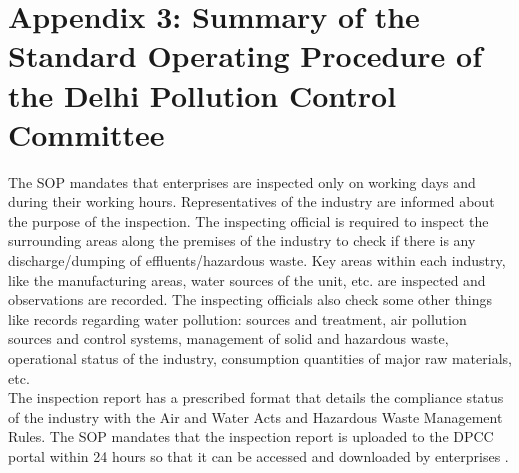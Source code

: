 \documentclass[a4paper, 12pt]{article}
\begin{document}
		\newpage
		
		\section*{Appendix 3: Summary of the Standard Operating Procedure of the Delhi Pollution Control Committee}
				
		The SOP mandates that enterprises are inspected only on working days and during their working hours. Representatives of the industry are informed about the purpose of the inspection. The inspecting official is required to inspect the surrounding areas along the premises of the industry to check if there is any discharge/dumping of effluents/hazardous waste. Key areas within each industry, like the manufacturing areas, water sources of the unit, etc. are inspected and observations are recorded. The inspecting officials also check some other things like records regarding water pollution: sources and treatment, air pollution sources and control systems, management of solid and hazardous waste, operational status of the industry, consumption quantities of major raw materials, etc. \\
		
		The inspection report has a prescribed format that details the compliance status of the industry with the Air and Water Acts and Hazardous Waste Management Rules. The SOP mandates that the inspection report is uploaded to the DPCC portal within 24 hours so that it can be accessed and downloaded by enterprises \parencite{DPCCb}.\\				
\end{document}

